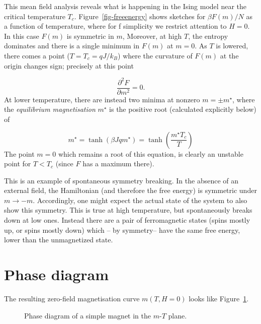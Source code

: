 \documentclass[
  letterpaper,
  enabledeprecatedfontcommands]{report}
\begin{document}
This mean field analysis reveals what is happening in the Ising model
near the critical temperature \(T_c\). Figure~\ref{fig-freeenergy} shows
sketches for \(\beta F(m)/N\) as a function of temperature, where for f
simplicity we restrict attention to \(H=0\). In this case \(F(m)\) is
symmetric in \(m\), Moreover, at high \(T\), the entropy dominates and
there is a single minimum in \(F(m)\) at \(m=0\). As \(T\) is lowered,
there comes a point (\(T=T_c=qJ/k_B\)) where the curvature of \(F(m)\)
at the origin changes sign; precisely at this point

\[\frac{\partial^2 F}{\partial m^2}=0.\] At lower temperature, there are
instead two minima at nonzero \(m=\pm m^\star\), where the
\emph{equilibrium magnetisation} \(m^\star\) is the positive root
(calculated explicitly below) of

\[m^\star=\tanh(\beta Jqm^\star)= \tanh(\frac{m^\star T_c}{T})\] The
point \(m=0\) which remains a root of this equation, is clearly an
unstable point for \(T<T_c\) (since \(F\) has a maximum there).

This is an example of spontaneous symmetry breaking. In the absence of
an external field, the Hamiltonian (and therefore the free energy) is
symmetric under \(m\to -m\). Accordingly, one might expect the actual
state of the system to also show this symmetry. This is true at high
temperature, but spontaneously breaks down at low ones. Instead there
are a pair of ferromagnetic states (spins mostly up, or spins mostly
down) which -- by symmetry-- have the same free energy, lower than the
unmagnetized state.

\section{Phase diagram}\label{phase-diagram}

The resulting zero-field magnetisation curve \(m(T,H=0)\) looks like
Figure~\ref{fig-isingmag}.

\begin{figure}


\caption{\label{fig-isingmag}Phase diagram of a simple magnet in the
\(m\)-\(T\) plane.}

\end{figure}%
\end{document}
